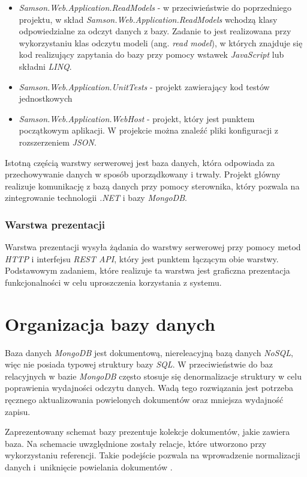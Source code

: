 \documentclass[a4paper,twoside,12pt]{book}
\newcommand{\obcy}[1]{\emph{#1}}
\newcommand{\ang}[1]{{\selectlanguage{british}\obcy{#1}}}
\begin{document}
\begin{itemize}
	\item \textit{Samson.Web.Application.ReadModels} - w przeciwieństwie do poprzedniego projektu, w skład \textit{Samson.Web.Application.ReadModels} wchodzą klasy odpowiedzialne za odczyt danych z bazy. Zadanie to jest realizowana przy wykorzystaniu klas odczytu modeli (ang. \ang{read model}), w których znajduje się kod realizujący zapytania do bazy przy pomocy wstawek \textit{JavaScript} lub składni \textit{LINQ}.
	\item \textit{Samson.Web.Application.UnitTests} - projekt zawierający kod testów jednostkowych
	\item \textit{Samson.Web.Application.WebHost} - projekt, który jest punktem początkowym aplikacji. W projekcie można znaleźć pliki konfiguracji z rozszerzeniem \textit{JSON}.
\end{itemize}
Istotną częścią warstwy serwerowej jest baza danych, która odpowiada za przechowywanie danych w sposób uporządkowany i trwały. Projekt główny realizuje komunikację z bazą danych przy pomocy sterownika, który pozwala na zintegrowanie technologii \textit{.NET} i bazy \textit{MongoDB}.

\subsubsection{Warstwa prezentacji}
Warstwa prezentacji wysyła żądania do warstwy serwerowej przy pomocy metod \textit{HTTP} i interfejsu \textit{REST API}, który jest punktem łączącym obie warstwy. Podstawowym zadaniem, które realizuje ta warstwa jest graficzna prezentacja funkcjonalności w celu uproszczenia korzystania z systemu.

\section{Organizacja bazy danych}
Baza danych \textit{MongoDB} jest dokumentową, niereleacyjną bazą danych \textit{NoSQL}, więc nie posiada typowej struktury bazy \textit{SQL}. W przeciwieństwie do baz relacyjnych w bazie \textit{MongoDB} często stosuje się denormalizacje struktury w celu poprawienia wydajności odczytu danych. Wadą tego rozwiązania jest potrzeba ręcznego aktualizowania powielonych dokumentów oraz mniejsza wydajność zapisu.

Zaprezentowany schemat bazy prezentuje kolekcje dokumentów, jakie zawiera baza. Na schemacie uwzględnione zostały relacje, które utworzono przy wykorzystaniu referencji. Takie podejście pozwala na wprowadzenie normalizacji danych i~uniknięcie powielania dokumentów \cite{bib:mongoRelations}.
\end{document}
